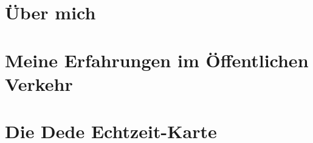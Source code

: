 \documentclass{beamer}
\begin{document}
\begin{frame}
  \titlepage
\end{frame}


\section{Über mich}



\section{Meine Erfahrungen im Öffentlichen Verkehr}





%

\bgroup


%

\egroup

%

%

%

%

%

\section{Die Dede Echtzeit-Karte}

%

\bgroup
\end{document}
